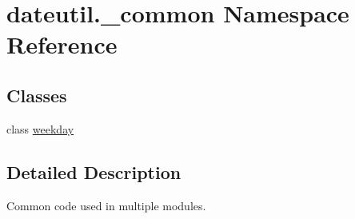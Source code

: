 \hypertarget{namespacedateutil_1_1__common}{}\section{dateutil.\+\_\+common Namespace Reference}
\label{namespacedateutil_1_1__common}
\subsection*{Classes}
\begin{DoxyCompactItemize}
\item 
class \hyperlink{classdateutil_1_1__common_1_1weekday}{weekday}
\end{DoxyCompactItemize}


\subsection{Detailed Description}
\begin{DoxyVerb}Common code used in multiple modules.
\end{DoxyVerb}
 